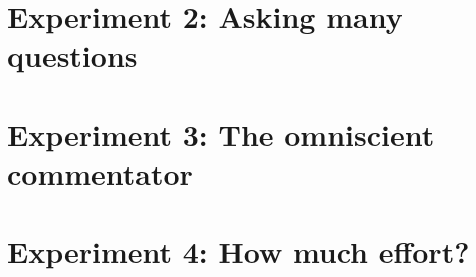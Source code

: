 \documentclass[11pt]{article}
\begin{document}
\section{Experiment 2: Asking many questions}
\label{sec:experiment_2_asking_many_questions}

\section{Experiment 3: The omniscient commentator}
\label{sec:experiment_3_the_omniscient_commentator}

\section{Experiment 4: How much effort?}
\label{sec:experiment_4_how_much_effort}

\clearpage


\end{document}
